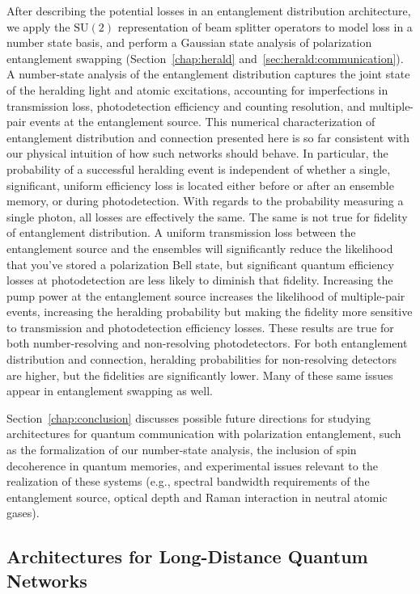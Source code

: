 \documentclass[aps,twocolumn,secnumarabic,amsmath,amssymb,pra,groupedaddress,
showpacs, showkeys,draft]{revtex4-1}
\newcommand{\pna}[1]{\left(#1\right)}
\begin{document}
After describing the potential losses in an entanglement distribution
architecture, we apply the $\textrm{SU}\pna{2}$ representation of beam splitter
operators to model loss in a number state basis, and perform a Gaussian state
analysis of polarization entanglement swapping (Section~\ref{chap:herald}
and~\ref{sec:herald:communication}). A number-state analysis of the
entanglement distribution captures the joint state of the heralding light and
atomic excitations, accounting for imperfections in transmission loss,
photodetection efficiency and counting resolution, and multiple-pair events at
the entanglement source. This numerical characterization of entanglement
distribution and connection presented here is so far consistent with our
physical intuition of how such networks should behave. In particular, the
probability of a successful heralding event is independent of whether a single,
significant, uniform efficiency loss is located either before or after an
ensemble memory, or during photodetection. With regards to the probability
measuring a single photon, all losses are effectively the same. The same is not
true for fidelity of entanglement distribution. A uniform transmission loss
between the entanglement source and the ensembles will significantly reduce the
likelihood that you've stored a polarization Bell state, but significant
quantum efficiency losses at photodetection are less likely to diminish that
fidelity. Increasing the pump power at the entanglement source increases the
likelihood of multiple-pair events, increasing the heralding probability but
making the fidelity more sensitive to transmission and photodetection
efficiency losses. These results are true for both number-resolving and
non-resolving photodetectors. For both entanglement distribution and
connection, heralding probabilities for non-resolving detectors are higher, but
the fidelities are significantly lower. Many of these same issues appear in
entanglement swapping as well.

Section~\ref{chap:conclusion} discusses possible future directions for studying
architectures for quantum communication with polarization entanglement, such as
the formalization of our number-state analysis, the inclusion of spin
decoherence in quantum memories, and experimental issues relevant to the
realization of these systems (e.g., spectral bandwidth requirements of the
entanglement source, optical depth and Raman interaction in neutral atomic
gases).

\subsection{Architectures for Long-Distance Quantum Networks\label{sec:intro:architectures}}
\end{document}
